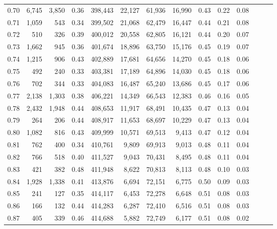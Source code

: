 \begin{tabular}{rrrrrrrrrrrrrr}
0.70 &   6,745 &  3,850 &  0.36 &  398,443 &   22,127 &  61,936 &  16,990 &  0.43 &  0.22 &      0.08 \\
0.71 &   1,059 &    543 &  0.34 &  399,502 &   21,068 &  62,479 &  16,447 &  0.44 &  0.21 &      0.08 \\
0.72 &     510 &    326 &  0.39 &  400,012 &   20,558 &  62,805 &  16,121 &  0.44 &  0.20 &      0.07 \\
0.73 &   1,662 &    945 &  0.36 &  401,674 &   18,896 &  63,750 &  15,176 &  0.45 &  0.19 &      0.07 \\
0.74 &   1,215 &    906 &  0.43 &  402,889 &   17,681 &  64,656 &  14,270 &  0.45 &  0.18 &      0.06 \\
0.75 &     492 &    240 &  0.33 &  403,381 &   17,189 &  64,896 &  14,030 &  0.45 &  0.18 &      0.06 \\
0.76 &     702 &    344 &  0.33 &  404,083 &   16,487 &  65,240 &  13,686 &  0.45 &  0.17 &      0.06 \\
0.77 &   2,138 &  1,303 &  0.38 &  406,221 &   14,349 &  66,543 &  12,383 &  0.46 &  0.16 &      0.05 \\
0.78 &   2,432 &  1,948 &  0.44 &  408,653 &   11,917 &  68,491 &  10,435 &  0.47 &  0.13 &      0.04 \\
0.79 &     264 &    206 &  0.44 &  408,917 &   11,653 &  68,697 &  10,229 &  0.47 &  0.13 &      0.04 \\
0.80 &   1,082 &    816 &  0.43 &  409,999 &   10,571 &  69,513 &   9,413 &  0.47 &  0.12 &      0.04 \\
0.81 &     762 &    400 &  0.34 &  410,761 &    9,809 &  69,913 &   9,013 &  0.48 &  0.11 &      0.04 \\
0.82 &     766 &    518 &  0.40 &  411,527 &    9,043 &  70,431 &   8,495 &  0.48 &  0.11 &      0.04 \\
0.83 &     421 &    382 &  0.48 &  411,948 &    8,622 &  70,813 &   8,113 &  0.48 &  0.10 &      0.03 \\
0.84 &   1,928 &  1,338 &  0.41 &  413,876 &    6,694 &  72,151 &   6,775 &  0.50 &  0.09 &      0.03 \\
0.85 &     241 &    127 &  0.35 &  414,117 &    6,453 &  72,278 &   6,648 &  0.51 &  0.08 &      0.03 \\
0.86 &     166 &    132 &  0.44 &  414,283 &    6,287 &  72,410 &   6,516 &  0.51 &  0.08 &      0.03 \\
0.87 &     405 &    339 &  0.46 &  414,688 &    5,882 &  72,749 &   6,177 &  0.51 &  0.08 &      0.02 \\

\end{tabular}
